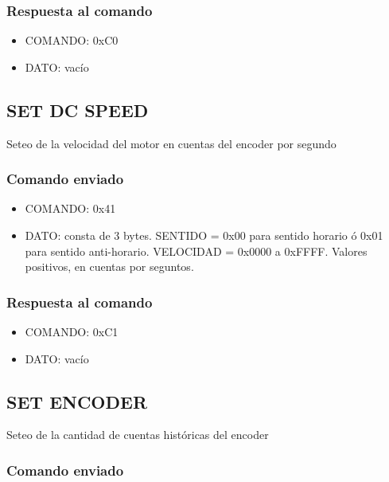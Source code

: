 \documentclass[a4paper,10pt]{article}
\begin{document}
\subsubsection*{Respuesta al comando}

\begin{itemize}
	\item{COMANDO:} 0xC0
	\item{DATO:} vac\'io
\end{itemize}

\subsection{SET DC SPEED}
\label{set_dc_speed}

Seteo de la velocidad del motor en cuentas del encoder por segundo

\subsubsection*{Comando enviado}

\begin{itemize}
	\item{COMANDO:} 0x41
	\item{DATO:} consta de 3 bytes.
		SENTIDO = 0x00 para sentido horario \'o 0x01 para sentido anti-horario.
		VELOCIDAD = 0x0000 a 0xFFFF. Valores positivos, en cuentas por seguntos.
\end{itemize}

\subsubsection*{Respuesta al comando}

\begin{itemize}
	\item{COMANDO:} 0xC1
	\item{DATO:} vac\'io
\end{itemize}

\subsection{SET ENCODER}
\label{set_encoder}

Seteo de la cantidad de cuentas hist\'oricas del encoder

\subsubsection*{Comando enviado}
\end{document}
